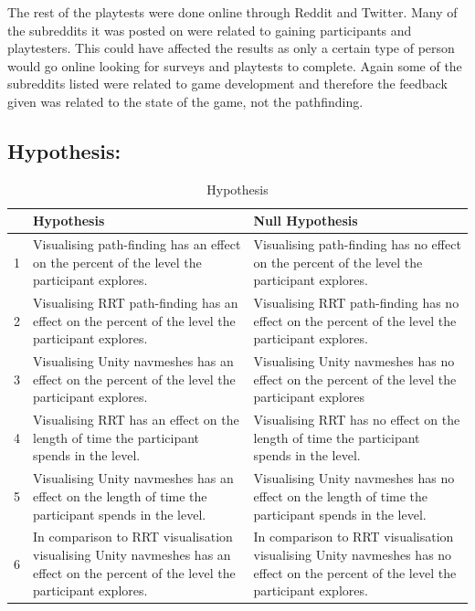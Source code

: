 \documentclass[journal]{IEEEtran}
\begin{document}
	The rest of the playtests were done online through Reddit and Twitter. Many of the subreddits it was posted on were related to gaining participants and playtesters. This could have affected the results as only a certain type of person would go online looking for surveys and playtests to complete. Again some of the subreddits listed were related to game development and therefore the feedback given was related to the state of the game, not the pathfinding.     
	
	
	\subsection{Hypothesis:} \label{hypothesis}
	\begin{table}[h]
		\centering
		\caption{Hypothesis}
		\label{table:Hypothesis}
		\def\arraystretch{1.5}
		\begin{tabular}{|c|p{7.5cm}|p{7.5cm}|}
			\hline
			& \textbf{Hypothesis}& \textbf{Null Hypothesis} \\
			\hline
			1 & Visualising path-finding has an effect on the percent of the level the participant explores.
			& Visualising path-finding has no effect on the percent of the level the participant explores.
			\\ \hline
			
			2 & Visualising RRT path-finding has an effect on the percent of the level the participant explores.
			& Visualising RRT path-finding has no effect on the percent of the level the participant explores.
			\\ \hline
			
			3 & Visualising Unity navmeshes has an effect on the percent of the level the participant explores.
			& Visualising Unity navmeshes has no effect on the percent of the level the participant explores
			\\ \hline
			
			4 & Visualising RRT has an effect on the length of time the participant spends in the level. 
			& Visualising RRT has no effect on the length of time the participant spends in the level. 
			\\ \hline
			
			5 & Visualising Unity navmeshes has an effect on the length of time the participant spends in the level. 
			& Visualising Unity navmeshes has no effect on the length of time the participant spends in the level.
			\\ \hline
			
			6 & In comparison to RRT visualisation visualising Unity navmeshes has an effect on the percent of the level the participant explores.
			& In comparison to RRT visualisation visualising Unity navmeshes has no effect on the percent of the level the participant explores.
			\\ \hline
			

\end{tabular}
\end{table}
\end{document}
